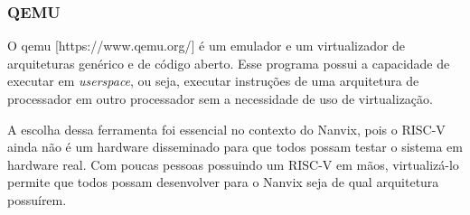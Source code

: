 \subsubsection{QEMU}

O qemu [https://www.qemu.org/] é um emulador e um virtualizador de arquiteturas genérico e de código aberto. Esse programa possui a capacidade de executar em \emph{userspace}, ou seja, executar instruções de uma arquitetura de processador em outro processador sem a necessidade de uso de virtualização.

A escolha dessa ferramenta foi essencial no contexto do Nanvix, pois o RISC-V ainda não é um hardware disseminado para que todos possam testar o sistema em hardware real. Com poucas pessoas possuindo um RISC-V em mãos, virtualizá-lo permite que todos possam desenvolver para o Nanvix seja de qual arquitetura possuírem.

